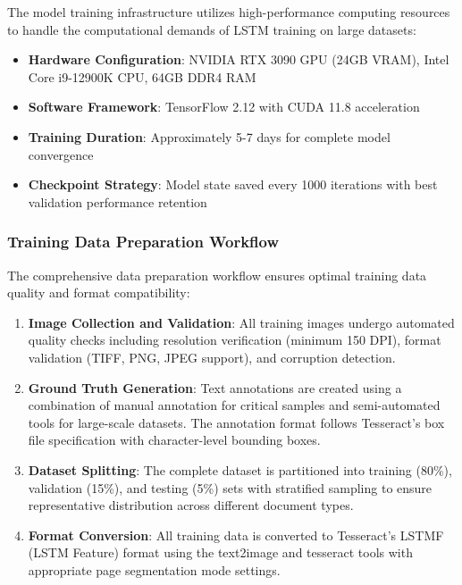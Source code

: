 The model training infrastructure utilizes high-performance computing resources to handle the computational demands of LSTM training on large datasets:

\begin{itemize}
\item \textbf{Hardware Configuration}: NVIDIA RTX 3090 GPU (24GB VRAM), Intel Core i9-12900K CPU, 64GB DDR4 RAM
\item \textbf{Software Framework}: TensorFlow 2.12 with CUDA 11.8 acceleration
\item \textbf{Training Duration}: Approximately 5-7 days for complete model convergence
\item \textbf{Checkpoint Strategy}: Model state saved every 1000 iterations with best validation performance retention
\end{itemize}

\subsubsection{Training Data Preparation Workflow}

The comprehensive data preparation workflow ensures optimal training data quality and format compatibility:

\begin{enumerate}
\item \textbf{Image Collection and Validation}: All training images undergo automated quality checks including resolution verification (minimum 150 DPI), format validation (TIFF, PNG, JPEG support), and corruption detection.

\item \textbf{Ground Truth Generation}: Text annotations are created using a combination of manual annotation for critical samples and semi-automated tools for large-scale datasets. The annotation format follows Tesseract's box file specification with character-level bounding boxes.

\item \textbf{Dataset Splitting}: The complete dataset is partitioned into training (80\%), validation (15\%), and testing (5\%) sets with stratified sampling to ensure representative distribution across different document types.

\item \textbf{Format Conversion}: All training data is converted to Tesseract's LSTMF (LSTM Feature) format using the text2image and tesseract tools with appropriate page segmentation mode settings.
\end{enumerate}

